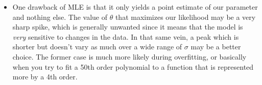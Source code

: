 \begin{itemize}
	\item One drawback of MLE is that it only yields a point estimate of our
		parameter and nothing else. The value of \( \theta \) that maximizes our
		likelihood may be a very sharp spike, which is generally unwanted since it
		means that the model is \textit{very} sensitive to changes in the data. In
		that same vein, a peak which is shorter but doesn't vary as much over a wide
		range of \( \sigma \) may be a better choice. The former case is much more
		likely during overfitting, or basically when you try to fit a 50th order
		polynomial to a function that is represented more by a 4th order.    
\end{itemize}
